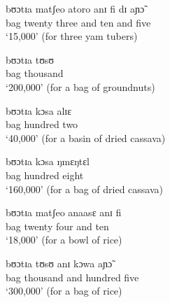 \begin{exe}
\ex\label{ex:price-market}
\begin{xlist}


\ex\label{ex:yamtubers}
\gll bʊɔtɪa matʃeo atoro anɪ fi dɪ  aɲɔ̃\\
bag twenty three and ten and five\\
\glt `15,000' (for  three yam tubers)




\ex\label{ex:groundnutbag}
\gll bʊɔtɪa tʊsʊ\\
bag thousand\\
\glt `200,000' (for a bag of groundnuts)


\ex\label{ex:driedcassava}
\gll bʊɔtɪa kɔsa alɪɛ\\
bag hundred two\\
\glt `40,000' (for a basin of dried cassava)


\ex\label{ex:cassavabag}
\gll bʊɔtɪa kɔsa ŋmɛŋtɛl\\
bag hundred eight\\
\glt `160,000' (for a bag of dried cassava) 


\ex\label{ex:ricebowl}
\gll bʊɔtɪa matʃeo anaasɛ anɪ fi\\
bag twenty four and ten\\
\glt `18,000' (for a bowl of rice) 

\ex\label{ex:Ricebag}
\gll bʊɔtɪa tʊsʊ anɪ kɔwa  aɲɔ̃\\
bag thousand and hundred five\\
\glt `300,000' (for a bag of rice) 





\end{xlist}
\end{exe}


